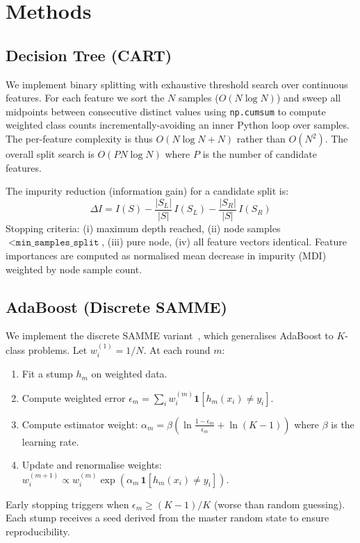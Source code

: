 \documentclass[conference]{IEEEtran}
\begin{document}
\section{Methods}
\label{sec:methods}

\subsection{Decision Tree (CART)}
We implement binary splitting with exhaustive threshold search over
continuous features.  For each feature we sort the $N$ samples
($O(N\log N)$) and sweep all midpoints between consecutive distinct
values using \texttt{np.cumsum} to compute weighted class counts
incrementally-avoiding an inner Python loop over samples.  The
per-feature complexity is thus $O(N\log N + N)$ rather than
$O(N^2)$.  The overall split search is $O(PN\log N)$ where $P$ is
the number of candidate features.

The impurity reduction (information gain) for a candidate split is:
\begin{equation}
\Delta I = I(S) - \frac{|S_L|}{|S|}\,I(S_L) - \frac{|S_R|}{|S|}\,I(S_R)
\label{eq:gain}
\end{equation}
Stopping criteria: (i) maximum depth reached, (ii) node samples
$< \texttt{min\_samples\_split}$, (iii) pure node, (iv) all feature
vectors identical.  Feature importances are computed as normalised
mean decrease in impurity (MDI) weighted by node sample count.

\subsection{AdaBoost (Discrete SAMME)}
We implement the discrete SAMME variant~\cite{hastie2009elements},
which generalises AdaBoost to $K$-class problems.  Let
$w_i^{(1)} = 1/N$.  At each round $m$:
\begin{enumerate}
  \item Fit a stump $h_m$ on weighted data.
  \item Compute weighted error $\epsilon_m = \sum_i w_i^{(m)}\mathbf{1}[h_m(x_i)\neq y_i]$.
  \item Compute estimator weight:
    $\alpha_m = \beta\!\left(\ln\frac{1{-}\epsilon_m}{\epsilon_m} + \ln(K{-}1)\right)$
    where $\beta$ is the learning rate.
  \item Update and renormalise weights:
    $w_i^{(m+1)} \propto w_i^{(m)}\exp(\alpha_m\,\mathbf{1}[h_m(x_i)\neq y_i])$.
\end{enumerate}
Early stopping triggers when $\epsilon_m \ge (K-1)/K$ (worse than
random guessing).  Each stump receives a seed derived from the master
random state to ensure reproducibility.
\end{document}
